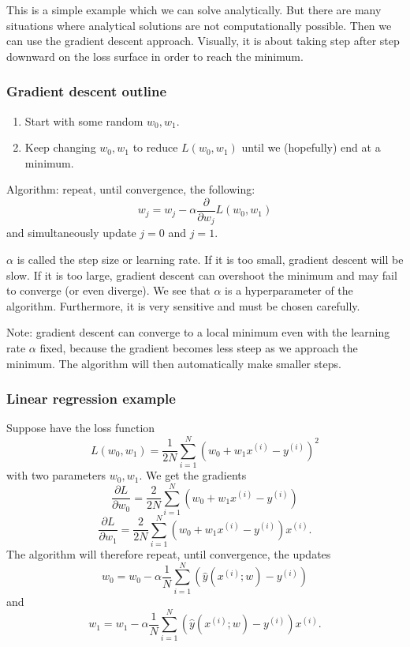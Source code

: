 \documentclass[a4paper,12pt]{article}
\begin{document}
This is a simple example which we can solve analytically. But there are many situations where analytical solutions are not computationally possible. Then we can use the gradient descent approach. Visually, it is about taking step after step downward on the loss surface in order to reach the minimum. 

\subsubsection{Gradient descent outline}

\begin{enumerate}
\item Start with some random $w_0, w_1$.
\item Keep changing $w_0, w_1$ to reduce $L(w_0, w_1)$ until we (hopefully) end at a minimum.
\end{enumerate}
Algorithm: repeat, until convergence, the following: 
$$w_j = w_j  - \alpha \frac{\partial}{\partial w_j} L(w_0, w_1)$$
and simultaneously update $j=0$ and $j=1$. 

$\alpha$ is called the step size or learning rate. If it is too small, gradient descent will be slow. If it is too large, gradient descent can overshoot the minimum and may fail to converge (or even diverge). We see that $\alpha$ is a hyperparameter of the algorithm. Furthermore, it is very sensitive and must be chosen carefully. 

Note: gradient descent can converge to a local minimum even with the learning rate $\alpha$ fixed, because the gradient becomes less steep as we approach the minimum. The algorithm will then automatically make smaller steps. 

\subsubsection{Linear regression example}

Suppose have the loss function
$$L(w_0, w_1) = \frac{1}{2N} \sum_{i=1}^N\left(w_0 + w_1x^{(i)} - y^{(i)}\right)^2$$
with two parameters $w_0, w_1$. We get the gradients
$$\frac{\partial L}{\partial w_0} = \frac{2}{2N}\sum_{i=1}^N\left(w_0 + w_1x^{(i)} - y^{(i)}\right)$$
$$\frac{\partial L}{\partial w_1} = \frac{2}{2N}\sum_{i=1}^N\left(w_0 + w_1x^{(i)} - y^{(i)}\right)x^{(i)}.$$
The algorithm will therefore repeat, until convergence, the updates
$$w_0 = w_0 - \alpha\frac{1}{N}\sum_{i=1}^N\left(\hat y(x^{(i)}; w) - y^{(i)}\right)$$
and
$$w_1 = w_1 - \alpha\frac{1}{N}\sum_{i=1}^N\left(\hat y(x^{(i)}; w) - y^{(i)}\right)x^{(i)}.$$
\end{document}
